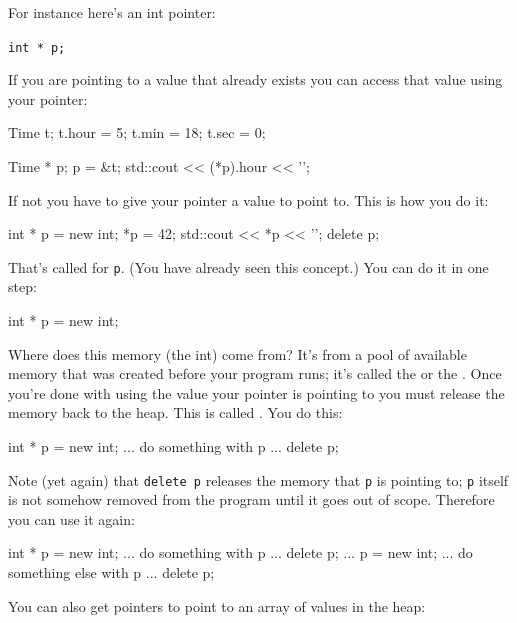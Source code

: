 \begin{center}
\begin{center}
For instance here's an int pointer:

\verb!int * p;!

If you are pointing to a value that already exists you can access that
value using your pointer:

\begin{consolethree}[escapeinside=||]
Time t;
t.hour = 5;
t.min = 18;
t.sec = 0;

Time * p;
p = &t;
std::cout << (*p).hour << '\n';
\end{consolethree}

If not you have to give your pointer a value to point to. This is how you do
it:

\begin{consolethree}[escapeinside=||]
int * p = new int;
*p = 42;
std::cout << *p << '\n';
delete p;
\end{consolethree}

That's called  for \texttt{p}. (You have already
seen this concept.) You can do it in one step:

\begin{consolethree}[escapeinside=||]
int * p = new int;
\end{consolethree}

Where does this memory (the int) come from? It's from a pool of
available memory that was created before your program runs; it's called
the  or the . Once you're done with using the value your
pointer is pointing to you must release the memory back to the heap.
This is called . You do this:

\begin{consolethree}[escapeinside=||]
int * p = new int;
... do something with p ...
delete p;
\end{consolethree}

Note (yet again) that \texttt{delete p} releases the memory that \texttt{p} is pointing
to; \texttt{p} itself is not somehow removed from the program until it goes out of
scope. Therefore you can use it again:

\begin{consolethree}[escapeinside=||]
int * p = new int;
... do something with p ...
delete p;
...
p = new int;
... do something else with p ...
delete p;
\end{consolethree}

You can also get pointers to point to an array of values in the heap:


\end{center}
\end{center}
